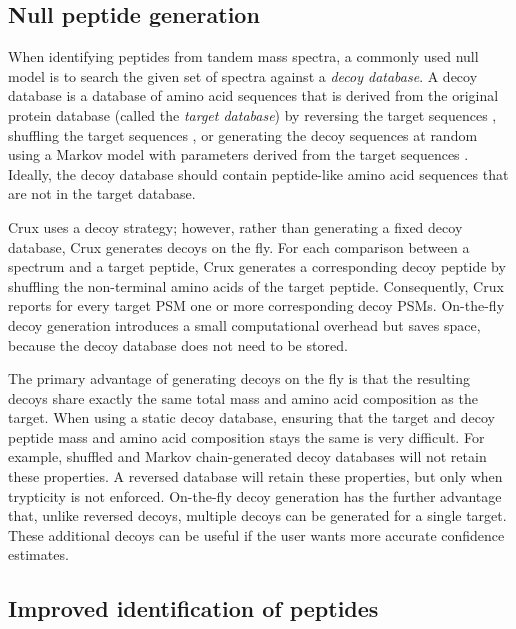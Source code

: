 \documentclass[12pt]{article}
\begin{document}
\subsection{Null peptide generation}
\label{section:on-the-fly}

When identifying peptides from tandem mass spectra, a commonly used
null model is to search the given set of spectra against a {\em decoy
database}.  A decoy database is a database of amino acid sequences
that is derived from the original protein database (called the {\em
target database}) by reversing the target sequences
\cite{moore:qscore}, shuffling the target sequences
\cite{klammer:effects}, or generating the decoy sequences at random
using a Markov model with parameters derived from the target sequences
\cite{colinge:olav}.  Ideally, the decoy database should contain
peptide-like amino acid sequences that are not in the target database.

Crux uses a decoy strategy; however, rather than generating a fixed
decoy database, Crux generates decoys on the fly.  For each comparison
between a spectrum and a target peptide, Crux generates a
corresponding decoy peptide by shuffling the non-terminal amino acids
of the target peptide.  Consequently, Crux reports for every target
PSM one or more corresponding decoy PSMs.  On-the-fly decoy generation
introduces a small computational overhead but saves space, because the
decoy database does not need to be stored.

The primary advantage of generating decoys on the fly is that the
resulting decoys share exactly the same total mass and amino acid
composition as the target.  When using a static decoy database,
ensuring that the target and decoy peptide mass and amino acid
composition stays the same is very difficult.  For example, shuffled
and Markov chain-generated decoy databases will not retain these
properties. A reversed database will retain these properties, but
only when trypticity is not enforced.  On-the-fly decoy generation has
the further advantage that, unlike reversed decoys, multiple decoys
can be generated for a single target.  These additional decoys can be
useful if the user wants more accurate confidence estimates.

\subsection{Improved identification of peptides}
\end{document}

